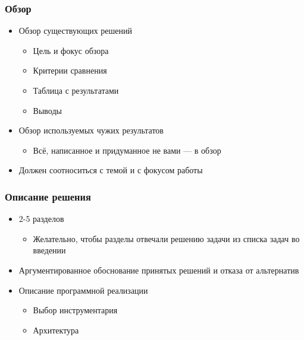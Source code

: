 \documentclass[xetex,mathserif,serif]{beamer}
\begin{document}
	\begin{frame}
		\frametitle{Обзор}
		\begin{itemize}
			\item Обзор существующих решений
			\begin{itemize}
				\item Цель и фокус обзора
				\item Критерии сравнения
				\item Таблица с результатами
				\item Выводы
			\end{itemize}
			\item Обзор используемых чужих результатов
			\begin{itemize}
				\item  Всё, написанное и придуманное не вами --- в обзор
			\end{itemize}
			\item Должен соотноситься с темой и с фокусом работы
		\end{itemize}
	\end{frame}

	\begin{frame}
		\frametitle{Описание решения}
		\begin{itemize}
			\item 2-5 разделов
			\begin{itemize}
				\item Желательно, чтобы разделы отвечали решению задачи из списка задач во введении
			\end{itemize}
			\item Аргументированное обоснование принятых решений и отказа от альтернатив
			\item Описание программной реализации
			\begin{itemize}
				\item Выбор инструментария
				\item Архитектура
			\end{itemize}
		\end{itemize}
	\end{frame}
\end{document}
